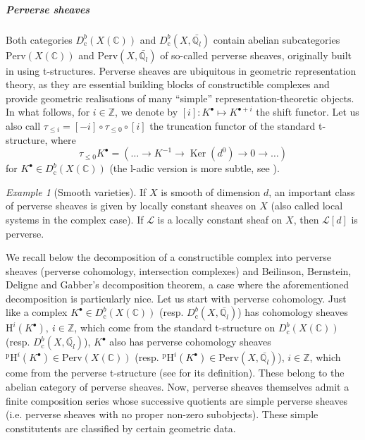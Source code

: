 \documentclass[11pt,english]{article}
\numberwithin{equation}{section}
\numberwithin{figure}{section}
\theoremstyle{definition}
\theoremstyle{plain}
\theoremstyle{remark}
\newtheorem{exmp}[df]{Example}
\DeclareMathOperator{\Ker}{Ker}
\newcommand\HH{\mathrm{H}}
\newcommand\ZZ{\mathbb{Z}}
\newcommand\QQ{\mathbb{Q}}
\newcommand\CC{\mathbb{C}}
\begin{document}
\subparagraph*{Perverse sheaves}

Both categories $D_{\mathrm{c}}^{b}(X(\CC))$ and $D_{\mathrm{c}}^{b}(X,\bar{\QQ_{l}})$
contain abelian subcategories $\mathrm{Perv}(X(\CC))$ and $\mathrm{Perv}(X,\bar{\QQ_{l}})$
of so-called perverse sheaves, originally built in \cite{BBDG18}
using t-structures. Perverse sheaves are ubiquitous in geometric representation
theory, as they are essential building blocks of constructible complexes
and provide geometric realisations of many ``simple'' representation-theoretic
objects. In what follows, for $i\in\ZZ$, we denote by $[i]:K^{\bullet}\mapsto K^{\bullet+i}$
the shift functor. Let us also call $\tau_{\leq i}=[-i]\circ\tau_{\leq0}\circ[i]$
the truncation functor of the standard t-structure, where\[
\tau_{\leq0}K^{\bullet}=(\ldots\rightarrow K^{-1}\rightarrow\Ker(d^0)\rightarrow0\rightarrow\ldots)
\] for $K^{\bullet}\in D_{\mathrm{c}}^{b}(X(\CC))$ (the l-adic version
is more subtle, see \cite[\S II.6.]{KW01}). 

\begin{exmp}[Smooth varieties]

If $X$ is smooth of dimension $d$, an important class of perverse
sheaves is given by locally constant sheaves on $X$ (also called
local systems in the complex case). If $\mathcal{L}$ is a locally
constant sheaf on $X$, then $\mathcal{L}[d]$ is perverse.

\end{exmp}

We recall below the decomposition of a constructible complex into
perverse sheaves (perverse cohomology, intersection complexes) and
Beilinson, Bernstein, Deligne and Gabber's decomposition theorem,
a case where the aforementioned decomposition is particularly nice.
Let us start with perverse cohomology. Just like a complex $K^{\bullet}\in D_{\mathrm{c}}^{b}(X(\CC))$
(resp. $D_{\mathrm{c}}^{b}(X,\bar{\QQ_{l}})$) has cohomology sheaves
$\HH^{i}(K^{\bullet}),\ i\in\ZZ$, which come from the standard t-structure
on $D_{\mathrm{c}}^{b}(X(\CC))$ (resp. $D_{\mathrm{c}}^{b}(X,\bar{\QQ_{l}})$),
$K^{\bullet}$ also has perverse cohomology sheaves $^{\mathrm{p}}\HH^{i}(K^{\bullet})\in\mathrm{Perv}(X(\CC))$
(resp. $^{\mathrm{p}}\HH^{i}(K^{\bullet})\in\mathrm{Perv}(X,\bar{\QQ_{l}})$),
$i\in\ZZ$, which come from the perverse t-structure (see \cite[\S 5.1.]{Dim04}\cite[\S III.1.]{KW01}
for its definition). These belong to the abelian category of perverse
sheaves. Now, perverse sheaves themselves admit a finite composition
series whose successive quotients are simple perverse sheaves (i.e.
perverse sheaves with no proper non-zero subobjects). These simple
constitutents are classified by certain geometric data. \index[notations]{h@$^{\mathrm{p}}\HH^{i}(K^{\bullet})$ - perverse cohomology sheaf of $K^{\bullet}$}
\end{document}
